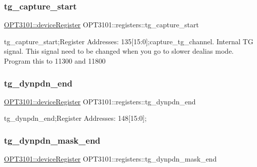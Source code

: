 \mbox{\label{class_o_p_t3101_1_1registers_a54a3244c947bb01cc57e706cd81ec0e2}} 
\subsubsection{\texorpdfstring{tg\+\_\+capture\+\_\+start}{tg\_capture\_start}}
{\footnotesize\ttfamily \mbox{\hyperlink{class_o_p_t3101_1_1device_register}{O\+P\+T3101\+::device\+Register}} O\+P\+T3101\+::registers\+::tg\+\_\+capture\+\_\+start}



tg\+\_\+capture\+\_\+start;Register Addresses\+: 135\mbox{[}15\+:0\mbox{]};capture\+\_\+tg\+\_\+channel. Internal TG signal. This signal need to be changed when you go to slower dealias mode. Program this to 11300 and 11800 

\mbox{\label{class_o_p_t3101_1_1registers_a97c8582f0bd644163e48032cf137ffc2}} 
\subsubsection{\texorpdfstring{tg\+\_\+dynpdn\+\_\+end}{tg\_dynpdn\_end}}
{\footnotesize\ttfamily \mbox{\hyperlink{class_o_p_t3101_1_1device_register}{O\+P\+T3101\+::device\+Register}} O\+P\+T3101\+::registers\+::tg\+\_\+dynpdn\+\_\+end}



tg\+\_\+dynpdn\+\_\+end;Register Addresses\+: 148\mbox{[}15\+:0\mbox{]}; 

\mbox{\label{class_o_p_t3101_1_1registers_a4e0bc00c21546c38705ff42eba70230f}} 
\subsubsection{\texorpdfstring{tg\+\_\+dynpdn\+\_\+mask\+\_\+end}{tg\_dynpdn\_mask\_end}}
{\footnotesize\ttfamily \mbox{\hyperlink{class_o_p_t3101_1_1device_register}{O\+P\+T3101\+::device\+Register}} O\+P\+T3101\+::registers\+::tg\+\_\+dynpdn\+\_\+mask\+\_\+end}



